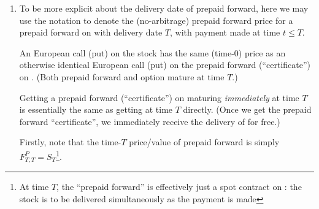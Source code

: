 \begin{enumerate}
\item To be more explicit about the delivery date of prepaid forward, here we
may use the notation  to denote the (no-arbitrage) prepaid
forward price for a prepaid forward on  with delivery date
\(T\), with payment made at time \(t\le T\).

\begin{proposition}
\label{prp:call-put-on-ppf-stock-same}
An European call (put) on the stock  has the same (time-0)
price as an otherwise identical European call (put) on the prepaid forward
(``certificate'')  on . (Both prepaid forward
and option mature at time \(T\).)
\end{proposition}
\begin{intuition}
Getting a prepaid forward (``certificate'')  on
 maturing \emph{immediately} at time \(T\) is essentially the
same as getting  at time \(T\) directly. (Once we get the
prepaid forward ``certificate'', we immediately receive the delivery of
 for free.)
\end{intuition}

\begin{pf}
Firstly, note that the time-\(T\) price/value of prepaid forward is simply
\(F_{T,T}^{P}=S_T\)\footnote{At time \(T\), the ``prepaid forward'' is effectively
just a spot contract on : the stock  is to
be delivered simultaneously as the payment is made}.


\end{pf}
\end{enumerate}
